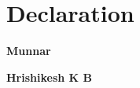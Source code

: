 \documentclass[11pt,a4paper]{moderncv}
\begin{document}
\section{Declaration}

\begin{minipage}{0.5\textwidth}
\begin{flushleft}
  \large
\bfseries Munnar
\end{flushleft}
\end{minipage}
\begin{minipage}{0.5\textwidth}

\begin{flushright}
  \large
\bfseries Hrishikesh \textsc{K B}
\end{flushright}
\end{minipage}

\end{document}
